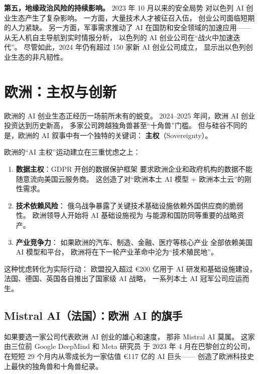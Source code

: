 \textbf{第五，地缘政治风险的持续影响。}
2023 年 10 月以来的安全局势
对以色列 AI 创业生态产生了复杂影响。
一方面，大量技术人才被征召入伍，
创业公司面临短期的人力紧缺。
另一方面，军事需求推动了
AI 在国防和安全领域的加速应用——
从无人机自主导航到实时情报分析，
以色列的 AI 创业公司在``战火中加速迭代''。
尽管如此，2024 年仍有超过 150 家新 AI 创业公司成立，
显示出以色列创业生态的非凡韧性。

\section{欧洲：主权与创新}
\label{sec:global-europe}

欧洲的 AI 创业生态正经历一场前所未有的蜕变。
2024--2025 年间，欧洲 AI 创业投资达到历史新高，
多家公司跨越独角兽甚至``十角兽''门槛。
但与硅谷不同的是，欧洲的 AI 叙事中有一个独特的关键词：
\textbf{主权}（Sovereignty）。

\begin{keybox}
欧洲的``AI 主权''运动建立在三重忧虑之上：
\begin{enumerate}[noitemsep]
  \item \textbf{数据主权}：GDPR 开创的数据保护框架
        要求欧洲企业和政府机构的数据不能随意流向美国云服务商。
        这创造了对``欧洲本土 AI 模型 + 欧洲本土云''的刚性需求。
  \item \textbf{技术依赖风险}：
        俄乌战争暴露了关键技术基础设施依赖外国供应商的脆弱性。
        欧洲领导人开始将 AI 基础设施视为
        与能源和国防同等重要的战略资产。
  \item \textbf{产业竞争力}：
        如果欧洲的汽车、制造、金融、医疗等核心产业
        全部依赖美国 AI 模型和平台，
        欧洲将在下一轮产业革命中沦为``技术殖民地''。
\end{enumerate}
这种忧虑转化为实际行动：
欧盟投入超过 €200 亿用于 AI 研发和基础设施建设，
法国、德国、英国各自推出了国家级 AI 战略，
一系列本土 AI 冠军公司应运而生。
\end{keybox}

\subsection{Mistral AI（法国）：欧洲 AI 的旗手}

如果要选一家公司代表欧洲 AI 创业的雄心和速度，
那非 Mistral AI 莫属。
这家由三位前 Google DeepMind 和 Meta 研究员
于 2023 年 4 月在巴黎创立的公司，
在短短 29 个月内从零成长为一家估值 €117 亿的 AI 巨头——
创造了欧洲科技史上最快的独角兽和十角兽纪录。

